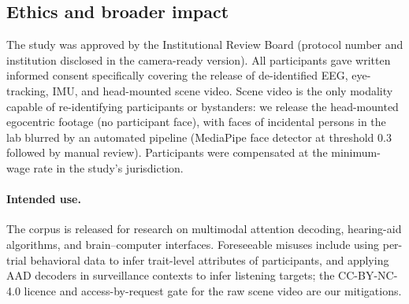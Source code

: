 \documentclass{article}
\begin{document}
\subsection{Ethics and broader impact}
\label{sec:ethics}

The study was approved by the Institutional Review Board (protocol number and institution disclosed in the camera-ready version). All participants gave written informed consent specifically covering the release of de-identified EEG, eye-tracking, IMU, and head-mounted scene video. Scene video is the only modality capable of re-identifying participants or bystanders: we release the head-mounted egocentric footage (no participant face), with faces of incidental persons in the lab blurred by an automated pipeline (MediaPipe face detector at threshold $0.3$ followed by manual review). Participants were compensated at the minimum-wage rate in the study's jurisdiction.

\paragraph{Intended use.} The corpus is released for research on multimodal attention decoding, hearing-aid algorithms, and brain--computer interfaces. Foreseeable misuses include using per-trial behavioral data to infer trait-level attributes of participants, and applying AAD decoders in surveillance contexts to infer listening targets; the CC-BY-NC-4.0 licence and access-by-request gate for the raw scene video are our mitigations.


 
\newpage

\end{document}
